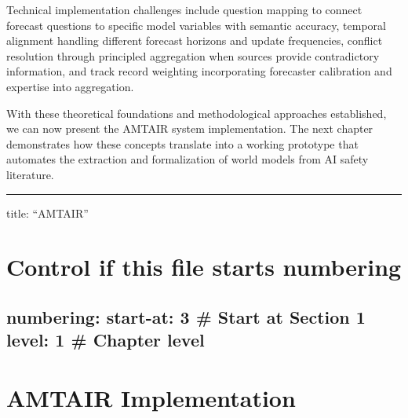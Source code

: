 \documentclass[
  11pt,
  letterpaper,
]{book}
\begin{document}
Technical implementation challenges include question mapping to connect
forecast questions to specific model variables with semantic accuracy,
temporal alignment handling different forecast horizons and update
frequencies, conflict resolution through principled aggregation when
sources provide contradictory information, and track record weighting
incorporating forecaster calibration and expertise into aggregation.

With these theoretical foundations and methodological approaches
established, we can now present the AMTAIR system implementation. The
next chapter demonstrates how these concepts translate into a working
prototype that automates the extraction and formalization of world
models from AI safety literature.

\begin{center}\rule{0.5\linewidth}{0.5pt}\end{center}

title: ``AMTAIR''


\chapter{Control if this file starts
numbering}\label{control-if-this-file-starts-numbering-3}

\section{numbering: start-at: 3 \# Start at Section 1 level: 1 \#
Chapter
level}\label{numbering-start-at-3-start-at-section-1-level-1-chapter-level}


\chapter{AMTAIR Implementation}\label{sec-amtair-implementation}
\end{document}
